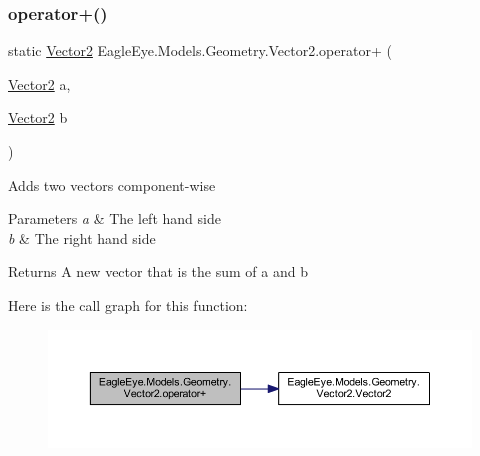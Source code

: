 \subsubsection{\texorpdfstring{operator+()}{operator+()}}
{\footnotesize\ttfamily static \mbox{\hyperlink{struct_eagle_eye_1_1_models_1_1_geometry_1_1_vector2}{Vector2}} Eagle\+Eye.\+Models.\+Geometry.\+Vector2.\+operator+ (\begin{DoxyParamCaption}\item[{\mbox{\hyperlink{struct_eagle_eye_1_1_models_1_1_geometry_1_1_vector2}{Vector2}}}]{a,  }\item[{\mbox{\hyperlink{struct_eagle_eye_1_1_models_1_1_geometry_1_1_vector2}{Vector2}}}]{b }\end{DoxyParamCaption})\hspace{0.3cm}{\ttfamily [static]}}



Adds two vectors component-\/wise 


\begin{DoxyParams}{Parameters}
{\em a} & The left hand side\\
\hline
{\em b} & The right hand side\\
\hline
\end{DoxyParams}
\begin{DoxyReturn}{Returns}
A new vector that is the sum of a and b
\end{DoxyReturn}
Here is the call graph for this function\+:\nopagebreak
\begin{figure}[H]
\begin{center}
\leavevmode
\includegraphics[width=350pt]{struct_eagle_eye_1_1_models_1_1_geometry_1_1_vector2_a2fee5bfd7f9b9f9cafe352390bef52a3_cgraph}
\end{center}
\end{figure}
\mbox{\label{struct_eagle_eye_1_1_models_1_1_geometry_1_1_vector2_a4306acd1970edab7db3d8654d2eb5c9d}} 
